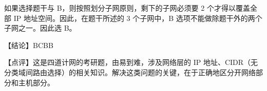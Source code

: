 \documentclass[UTF8]{ctexart}
\begin{document}
如果选择题干与 B，则按照划分子网原则，剩下的子网必须要 2 个才得以覆盖全部 IP 地址空间。因此，在题干所述的 3 个子网中，B 选项不能做除题干外的两个子网之一。因此选 B。

\BgThispage
\vspace{1em}
{\color{cyan!80!black}
【结论】BCBB

【点评】这是四道计网的考研题，由易到难，涉及网络层的 IP 地址、CIDR（无分类域间路由选择）的相关知识。解决这类问题的关键，在于正确地区分开网络部分和主机部分。
}
\end{document}
